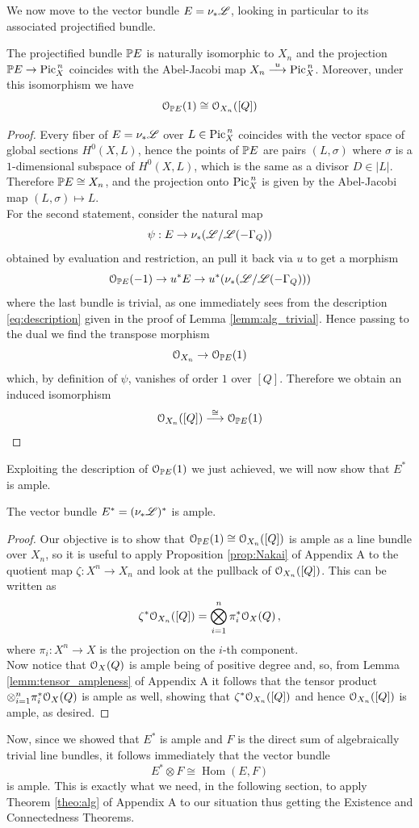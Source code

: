 	We now move to the vector bundle $E=\nu_{*} \mathscr{L}$, looking in particular to its associated projectified bundle.
	\begin{prop}
		The projectified bundle $\mathbb{P} E$ is naturally isomorphic to $X_n$ and the projection $\mathbb{P} E \to \operatorname{Pic}^{\,n}_X$ coincides with the Abel-Jacobi map $X_n \overset{u}\longrightarrow \operatorname{Pic}^{\,n}_X$. Moreover, under this isomorphism we have
		$$ \mathcal{O}_{\mathbb{P} E}(1) \cong \mathcal{O}_{X_n}([Q]) $$
	\end{prop}
	\begin{proof}
		Every fiber of $E=\nu_{*}\mathscr{L}$ over $L\in \operatorname{Pic}^{\,n}_X$ coincides with the vector space of global sections $H^0(X,L)$, hence the points of $\mathbb{P} E$ are pairs $(L,\sigma)$ where $\sigma$ is a $1$-dimensional subspace of $H^0(X,L)$, which is the same as a divisor $D\in |L|$. Therefore $\mathbb{P} E \cong X_n$, and the projection onto $\operatorname{Pic}^{\,n}_X$ is given by the Abel-Jacobi map $(L,\sigma) \mapsto L$.\\

		For the second statement, consider the natural map
		$$ \psi: E \to \nu_*(\mathscr{L}/\mathscr{L}(-\Gamma_Q)) $$
		obtained by evaluation and restriction, an pull it back via $u$ to get a morphism
		$$ \mathcal{O}_{\mathbb{P} E}(-1)\to u^* E \to u^*(\nu_*(\mathscr{L}/\mathscr{L}(-\Gamma_Q))) $$
		where the last bundle is trivial, as one immediately sees from the description \ref{eq:description} given in the proof of Lemma \ref{lemm:alg_trivial}. Hence passing to the dual we find the transpose morphism
		$$ \mathcal{O}_{X_n} \to \mathcal{O}_{\mathbb{P} E}(1) $$
		which, by definition of $\psi$, vanishes of order $1$ over $[Q]$. Therefore we obtain an induced isomorphism
		$$\mathcal{O}_{X_n}([Q]) \overset{\cong}\longrightarrow \mathcal{O}_{\mathbb{P} E}(1)$$ 
	\end{proof}
	Exploiting the description of $\mathcal{O}_{\mathbb{P} E}(1)$ we just achieved, we will now show that $E^*$ is ample.
	\begin{prop}
		The vector bundle $E^* = (\nu_{*}\mathscr{L})^*$ is ample.
	\end{prop}
	\begin{proof}
		Our objective is to show that $\mathcal{O}_{\mathbb{P} E}(1)\cong \mathcal{O}_{X_n}([Q])$ is ample as a line bundle over $X_n$, so it is useful to apply Proposition \ref{prop:Nakai} of Appendix A to the quotient map $\zeta:X^n\to X_n$ and look at the pullback of $\mathcal{O}_{X_n}([Q])$. This can be written as
		$$ \zeta^* \mathcal{O}_{X_n}([Q]) = \bigotimes_{i=1}^n \pi_i^* \mathcal{O}_X(Q)\,, $$
		where $\pi_i:X^n\to X$ is the projection on the $i$-th component.\\
		Now notice that $\mathcal{O}_X(Q)$ is ample being of positive degree and, so, from Lemma \ref{lemm:tensor_ampleness} of Appendix A it follows that the tensor product $\otimes_{i=1}^n \pi_i^* \mathcal{O}_X(Q)$ is ample as well, showing that $\zeta^* \mathcal{O}_{X_n}([Q])$ and hence $\mathcal{O}_{X_n}([Q])$ is ample, as desired.
	\end{proof}
	Now, since we showed that $E^*$ is ample and $F$ is the direct sum of algebraically trivial line bundles, it follows immediately that the vector bundle
	$$ E^*\otimes F \cong \operatorname{Hom}(E,F) $$
	is ample. This is exactly what we need, in the following section, to apply Theorem \ref{theo:alg} of Appendix A to our situation thus getting the Existence and Connectedness Theorems.

